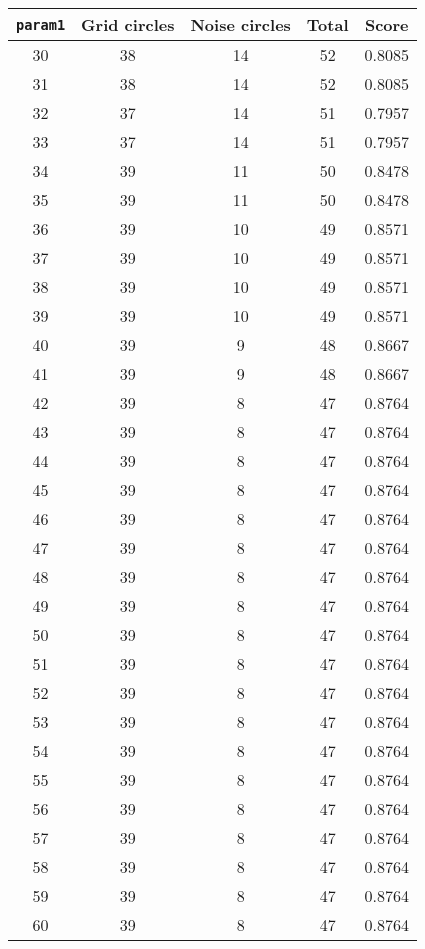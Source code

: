 \documentclass[letterpaper, 12pt]{article}
\begin{document}
\begin{longtable}{|c|c|c|c|c|}
\hline
\textbf{\texttt{param1}} & \textbf{Grid circles} & \textbf{Noise circles} & \textbf{Total} & \textbf{Score} \\
\hline
30 & 38 & 14 & 52 & 0.8085 \\
\hline
31 & 38 & 14 & 52 & 0.8085 \\
\hline
32 & 37 & 14 & 51 & 0.7957 \\
\hline
33 & 37 & 14 & 51 & 0.7957 \\
\hline
34 & 39 & 11 & 50 & 0.8478 \\
\hline
35 & 39 & 11 & 50 & 0.8478 \\
\hline
36 & 39 & 10 & 49 & 0.8571 \\
\hline
37 & 39 & 10 & 49 & 0.8571 \\
\hline
38 & 39 & 10 & 49 & 0.8571 \\
\hline
39 & 39 & 10 & 49 & 0.8571 \\
\hline
40 & 39 & 9 & 48 & 0.8667 \\
\hline
41 & 39 & 9 & 48 & 0.8667 \\
\hline
42 & 39 & 8 & 47 & 0.8764 \\
\hline
43 & 39 & 8 & 47 & 0.8764 \\
\hline
44 & 39 & 8 & 47 & 0.8764 \\
\hline
45 & 39 & 8 & 47 & 0.8764 \\
\hline
46 & 39 & 8 & 47 & 0.8764 \\
\hline
47 & 39 & 8 & 47 & 0.8764 \\
\hline
48 & 39 & 8 & 47 & 0.8764 \\
\hline
49 & 39 & 8 & 47 & 0.8764 \\
\hline
50 & 39 & 8 & 47 & 0.8764 \\
\hline
51 & 39 & 8 & 47 & 0.8764 \\
\hline
52 & 39 & 8 & 47 & 0.8764 \\
\hline
53 & 39 & 8 & 47 & 0.8764 \\
\hline
54 & 39 & 8 & 47 & 0.8764 \\
\hline
55 & 39 & 8 & 47 & 0.8764 \\
\hline
56 & 39 & 8 & 47 & 0.8764 \\
\hline
57 & 39 & 8 & 47 & 0.8764 \\
\hline
58 & 39 & 8 & 47 & 0.8764 \\
\hline
59 & 39 & 8 & 47 & 0.8764 \\
\hline
60 & 39 & 8 & 47 & 0.8764 \\
\hline

\end{longtable}
\end{document}
